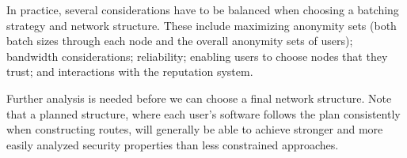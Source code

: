 \documentclass[11pt]{IEEEtran}
\begin{document}
In practice, several considerations have to be balanced when choosing
a batching strategy and network structure. These include maximizing
anonymity sets (both batch sizes through each node and the overall
anonymity sets of users); bandwidth considerations; reliability;
enabling users to choose nodes that they trust; and interactions with
the reputation system.

Further analysis is needed before we can choose a
final network structure. Note that a planned structure, where each
user's software follows the plan consistently when constructing
routes, will generally be able to achieve stronger and more easily
analyzed security properties than less constrained approaches.


\end{document}
